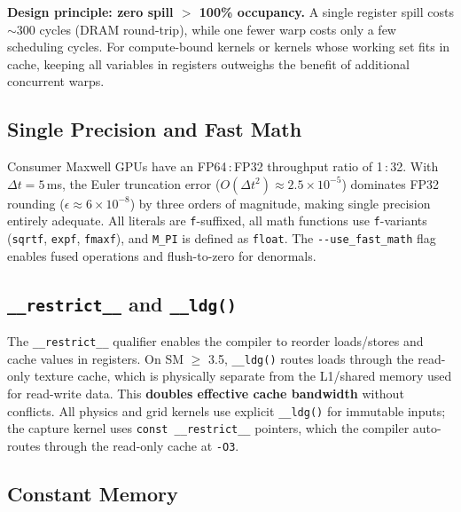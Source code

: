 \textbf{Design principle: zero spill $>$ 100\% occupancy.} A single register
spill costs $\sim$300 cycles (DRAM round-trip), while one fewer warp costs
only a few scheduling cycles. For compute-bound kernels or kernels whose
working set fits in cache, keeping all variables in registers outweighs the
benefit of additional concurrent warps.

\subsection{Single Precision and Fast Math}
\label{sec:fp32}

Consumer Maxwell GPUs have an FP64\,:\,FP32 throughput ratio of 1\,:\,32.
With $\Delta t = 5$\,ms, the Euler truncation error
($O(\Delta t^2) \approx 2.5 \times 10^{-5}$) dominates FP32 rounding
($\epsilon \approx 6 \times 10^{-8}$) by three orders of magnitude, making
single precision entirely adequate. All literals are \texttt{f}-suffixed, all
math functions use \texttt{f}-variants (\texttt{sqrtf}, \texttt{expf},
\texttt{fmaxf}), and \texttt{M\_PI} is defined as \texttt{float}. The
\texttt{-{}-use\_fast\_math} flag enables fused operations and
flush-to-zero for denormals.

\subsection{\texttt{\_\_restrict\_\_} and \texttt{\_\_ldg()}}
\label{sec:ldg}

The \texttt{\_\_restrict\_\_} qualifier enables the compiler to reorder
loads/stores and cache values in registers. On SM $\geq$ 3.5,
\texttt{\_\_ldg()} routes loads through the read-only texture cache, which is
physically separate from the L1/shared memory used for read-write data. This
\textbf{doubles effective cache bandwidth} without conflicts. All physics and
grid kernels use explicit \texttt{\_\_ldg()} for immutable inputs; the capture
kernel uses \texttt{const \_\_restrict\_\_} pointers, which the compiler
auto-routes through the read-only cache at \texttt{-O3}.

\subsection{Constant Memory}
\label{sec:constant}

